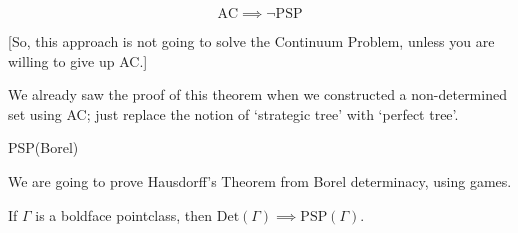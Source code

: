 \documentclass[]{article}
\renewcommand{\ac}{\textrm{AC}}
\newcommand{\Det}{\textrm{Det}}
\newcommand{\psp}{\textrm{PSP}}
\begin{document}
\begin{theorem*}[Bernstein]
    $$\ac \implies \neg\psp$$
\end{theorem*}
[So, this approach is not going to solve the Continuum Problem, unless you are willing to give up AC.]

We already saw the proof of this theorem when we constructed a non-determined set using AC; just replace the notion of `strategic tree' with `perfect tree'.

\begin{theorem*}[Hausdorff]
    PSP(Borel)
\end{theorem*}

We are going to prove Hausdorff's Theorem from Borel determinacy, using games.

\begin{theorem*}
    If $\Gamma$ is a boldface pointclass, then $\Det(\Gamma)\implies \psp(\Gamma)$.
\end{theorem*}
\end{document}
